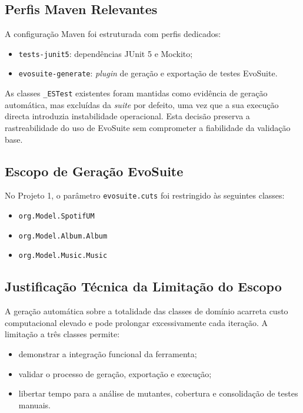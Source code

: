\documentclass{article}
\begin{document}
\subsection{Perfis Maven Relevantes}

A configuração Maven foi estruturada com perfis dedicados:
\begin{itemize}
    \item \texttt{tests-junit5}: dependências JUnit 5 e Mockito;
    \item \texttt{evosuite-generate}: \emph{plugin} de geração e exportação de testes EvoSuite.
\end{itemize}

As classes \texttt{\_ESTest} existentes foram mantidas como evidência de geração automática, mas excluídas da \emph{suite} por defeito, uma vez que a sua execução directa introduzia instabilidade operacional. Esta decisão preserva a rastreabilidade do uso de EvoSuite sem comprometer a fiabilidade da validação base.

\subsection{Escopo de Geração EvoSuite}

No Projeto 1, o parâmetro \texttt{evosuite.cuts} foi restringido às seguintes classes:
\begin{itemize}
    \item \texttt{org.Model.SpotifUM}
    \item \texttt{org.Model.Album.Album}
    \item \texttt{org.Model.Music.Music}
\end{itemize}

\subsection{Justificação Técnica da Limitação do Escopo}

A geração automática sobre a totalidade das classes de domínio acarreta custo computacional elevado e pode prolongar excessivamente cada iteração. A limitação a três classes permite:
\begin{itemize}
    \item demonstrar a integração funcional da ferramenta;
    \item validar o processo de geração, exportação e execução;
    \item libertar tempo para a análise de mutantes, cobertura e consolidação de testes manuais.
\end{itemize}
\end{document}
